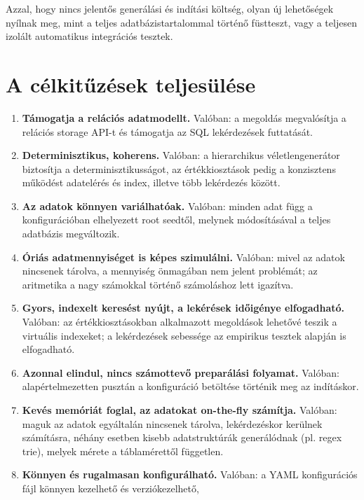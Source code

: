 \documentclass[
    parspace,
    noindent,
    nohyp,
]{elteiktdk}[2023/04/10]
\begin{document}
Azzal, hogy nincs jelentős generálási és indítási költség,
olyan új lehetőségek nyílnak meg, mint a teljes adatbázistartalommal történő füstteszt,
vagy a teljesen izolált automatikus integrációs tesztek.

\section{A célkitűzések teljesülése}

\begin{enumerate}
    \setlength\itemsep{-0.5em}
    \item \textbf{Támogatja a relációs adatmodellt.} Valóban:
          a megoldás megvalósítja a relációs storage API-t és
          támogatja az SQL lekérdezések futtatását.
    \item \textbf{Determinisztikus, koherens.} Valóban:
          a hierarchikus véletlengenerátor biztosítja a determinisztikusságot,
          az értékkiosztások pedig a konzisztens működést adatelérés és index,
          illetve több lekérdezés között.
    \item \textbf{Az adatok könnyen variálhatóak.} Valóban:
          minden adat függ a konfigurációban elhelyezett root seedtől,
          melynek módosításával a teljes adatbázis megváltozik.
    \item \textbf{Óriás adatmennyiséget is képes szimulálni.} Valóban:
          mivel az adatok nincsenek tárolva, a mennyiség önmagában nem jelent problémát;
          az aritmetika a nagy számokkal történő számoláshoz lett igazítva.
    \item \textbf{Gyors, indexelt keresést nyújt, a lekérések időigénye elfogadható.} Valóban:
          az értékkiosztásokban alkalmazott megoldások lehetővé teszik a virtuális indexeket;
          a lekérdezések sebessége az empirikus tesztek alapján is elfogadható.
    \item \textbf{Azonnal elindul, nincs számottevő preparálási folyamat.} Valóban:
          alapértelmezetten pusztán a konfiguráció betöltése történik meg az indításkor.
    \item \textbf{Kevés memóriát foglal, az adatokat on-the-fly számítja.} Valóban:
          maguk az adatok egyáltalán nincsenek tárolva, lekérdezéskor kerülnek számításra,
          néhány esetben kisebb adatstruktúrák generálódnak (pl. regex trie),
          melyek mérete a táblamérettől független.
    \item \textbf{Könnyen és rugalmasan konfigurálható.} Valóban:
          a YAML konfigurációs fájl könnyen kezelhető és verziókezelhető,

\end{enumerate}
\end{document}

